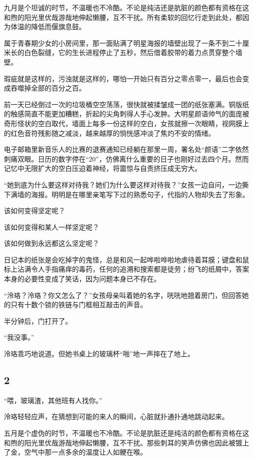 \documentclass[UTF8, scheme = chinese, openany]{ctexbook}
\begin{document}
九月是个坦诚的时节，不温暖也不冷酷。不论是纯洁还是肮脏的颜色都有资格在这和煦的阳光里优哉游哉地伸起懒腰，互不干扰。所有柔软的回忆行走到此处，都因为体温的降低而偃旗息鼓。

属于青春期少女的小房间里，那一面贴满了明星海报的墙壁出现了一条不到二十厘米长的白色裂缝，它的生长进程停止了五秒，然后借着胶带的着力点贯穿整个墙壁。

瑕疵就是这样的，污浊就是这样的，哪怕一开始只有百分之零点零一，最后也会变成吞噬掉全部的百分之百。

前一天已经倒过一次的垃圾桶空空荡荡，很快就被揉皱成一团的纸张塞满。铜版纸的触感简直不能更加糟糕，折起的尖角刺得人手心发肿。大明星颜语帅气的面庞被奇形怪状的空白取代，墙面上每多一份这样的空白，女孩就擦一次眼睛，视网膜上的红色音符残影随之减淡，越来越厚的惝恍感冲淡了焦灼不安的情绪。

电子邮箱里新音乐人的比赛的退赛通知已经躺在那里一周，署名处“颜语”二字依然刺痛双眼。日历的数字停在“20”，仿佛离什么重要的日子也刚好过去四个月。然而记忆中无限扩大的空白压迫着神经，将震惊与自责挤压成无穷大。

“她到底为什么要这样对待我？她们为什么要这样对待我？”女孩一边自问，一边撕下满墙的海报。明明是在哪里亲笔写下过的熟悉句子，代指的人物却失去了形象。

该如何变得坚定呢？

该如何变得和某人一样坚定呢？

该如何做到永远都这么坚定呢？

日记本的纸张是会吃掉字的鬼怪，总是和风一起哗啦哗啦地虐待着耳膜；键盘和鼠标上沾满令人手指痛痒的毒药，任何的追溯和搜索都是徒劳；纷飞的纸屑中，答案本身的必要性变成了笑话，因为问题本身已不存在。

“泠珞？泠珞？你又怎么了？”女孩母亲叫着她的名字，咣咣地翘着房门，但回答她的只有十数个锁的铁链与门框相互敲击的声音。

半分钟后，门打开了。

“我没事。”

泠珞乖巧地说道。但她书桌上的玻璃杯“啪”地一声摔在了地上。

\subsection{2}

“喂，玻璃渣，其他班有人找你。”

泠珞轻轻应声，在猜想到可能的来人的瞬间，心脏就扑通扑通地跳动起来。

五月是个虚伪的时节，不温暖也不冷酷。不论是肮脏还是纯洁的颜色都有资格在这和煦的阳光里优哉游哉地伸起懒腰，互不干扰。那些刺耳的笑声仿佛也因此被镀上了金，空气中那一点多余的温度让人如鲠在喉。
\end{document}
